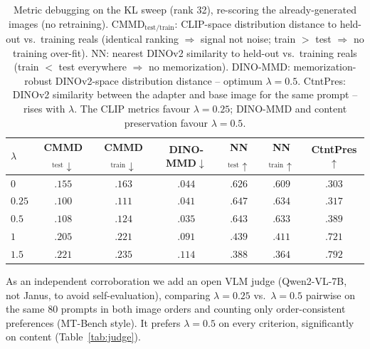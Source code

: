 \begin{table}[h]
\centering\small
\setlength{\tabcolsep}{5pt}
\begin{tabular}{lcccccc}
\toprule
$\lambda$ & CMMD$_{\text{test}}\downarrow$ & CMMD$_{\text{train}}\downarrow$ & DINO-MMD$\downarrow$ & NN$_{\text{test}}\uparrow$ & NN$_{\text{train}}\uparrow$ & CtntPres$\uparrow$ \\
\midrule
$0$    & $.155$ & $.163$ & $.044$ & $.626$ & $.609$ & $.303$ \\
$0.25$ & $\mathbf{.100}$ & $.111$ & $.041$ & $.647$ & $.634$ & $.317$ \\
$0.5$  & $.108$ & $.124$ & $\mathbf{.035}$ & $.643$ & $.633$ & $.389$ \\
$1$    & $.205$ & $.221$ & $.091$ & $.439$ & $.411$ & $.721$ \\
$1.5$  & $.221$ & $.235$ & $.114$ & $.388$ & $.364$ & $.792$ \\
\bottomrule
\end{tabular}
\caption{Metric debugging on the KL sweep (rank 32), re-scoring the
already-generated images (no retraining). CMMD$_{\text{test/train}}$: CLIP-space
distribution distance to held-out vs.\ training reals (identical ranking $\Rightarrow$
signal not noise; train $>$ test $\Rightarrow$ no training over-fit). NN: nearest
DINOv2 similarity to held-out vs.\ training reals (train $<$ test everywhere
$\Rightarrow$ no memorization). DINO-MMD: memorization-robust DINOv2-space
distribution distance -- optimum $\lambda{=}0.5$. CtntPres: DINOv2 similarity
between the adapter and base image for the same prompt -- rises with $\lambda$. The
CLIP metrics favour $\lambda{=}0.25$; DINO-MMD and content preservation favour
$\lambda{=}0.5$.}
\label{tab:metric-debug}
\end{table}

As an independent corroboration we add an open VLM judge (Qwen2-VL-7B, not Janus,
to avoid self-evaluation), comparing $\lambda{=}0.25$ vs.\ $\lambda{=}0.5$ pairwise
on the same $80$ prompts in both image orders and counting only order-consistent
preferences (MT-Bench style). It prefers $\lambda{=}0.5$ on every criterion,
significantly on content (Table~\ref{tab:judge}).

